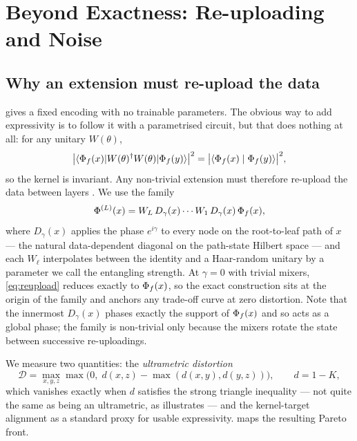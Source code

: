 \section{Beyond Exactness: Re-uploading and Noise}
\label{sec:reuploading}

\subsection{Why an extension must re-upload the data}

 gives a fixed encoding with no trainable parameters. The obvious
way to add expressivity is to follow it with a parametrised circuit, but that does
nothing at all: for any unitary $W(\theta)$,
\begin{equation}
  \label{eq:unitary-invariance}
  \bigl\lvert \langle \Phi_f(x) \rvert W(\theta)^{\dagger} W(\theta) \lvert \Phi_f(y) \rangle
  \bigr\rvert^{2} = \bigl\lvert\langle \Phi_f(x) \mid \Phi_f(y) \rangle\bigr\rvert^{2} ,
\end{equation}
so the kernel is invariant. Any non-trivial extension must therefore re-upload the data
between layers \citep{PerezSalinasEtAl2020DataReuploading,
RodriguezGrasaEtAl2024NeuralQuantumKernels}. We use the family
\begin{equation}
  \label{eq:reupload}
  \Phi^{(L)}(x) = W_L\, D_{\gamma}(x) \cdots W_1\, D_{\gamma}(x)\, \Phi_f(x) ,
\end{equation}
where $D_{\gamma}(x)$ applies the phase $e^{i\gamma}$ to every node on the root-to-leaf
path of $x$ --- the natural data-dependent diagonal on the path-state Hilbert space ---
and each $W_\ell$ interpolates between the identity and a Haar-random unitary by a
parameter we call the entangling strength. At $\gamma = 0$ with trivial mixers,
\cref{eq:reupload} reduces exactly to $\Phi_f(x)$, so the exact construction sits
at the origin of the family and anchors any trade-off curve at zero distortion. Note
that the innermost $D_{\gamma}(x)$ phases exactly the support of $\Phi_f(x)$ and so
acts as a global phase; the family is non-trivial only because the mixers rotate the
state between successive re-uploadings.

We measure two quantities: the \emph{ultrametric distortion}
\begin{equation}
  \label{eq:distortion}
  \mathcal{D} = \max_{x,y,z} \max\bigl(0,\; d(x,z) - \max(d(x,y), d(y,z))\bigr),
  \qquad d = 1 - K ,
\end{equation}
which vanishes exactly when $d$ satisfies the strong triangle inequality --- not
quite the same as being an ultrametric, as  illustrates
--- and the kernel-target alignment as a standard proxy for usable expressivity.
 maps the resulting Pareto front.

